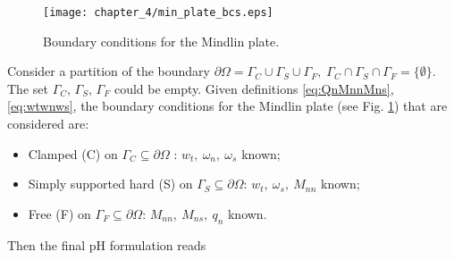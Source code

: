 \begin{figure}[tb]
	\centering
	\texttt{[image: chapter\_4/min\_plate\_bcs.eps]}
	\caption{Boundary conditions for the Mindlin plate.}
	\label{fig:bcs_min}
\end{figure}
Consider a partition of the boundary $\partial \Omega  = {\Gamma}_{C} \cup {\Gamma}_{S} \cup {\Gamma}_{F}, \; {\Gamma}_{C} \cap {\Gamma}_{S} \cap {\Gamma}_{F} = \{\emptyset\}$. The set $\Gamma_{C}, \, \Gamma_{S}, \, \Gamma_{F}$ could be empty. Given definitions \eqref{eq:QnMnnMns}, \eqref{eq:wtwnws}, the boundary conditions for the Mindlin plate \cite{duran1999approximation} (see Fig. \ref{fig:bcs_min}) that are considered are:
\begin{itemize}
\item Clamped (C) on $\Gamma_{C}\subseteq \partial \Omega$ : $w_t, \ \omega_{n}, \ \omega_{s}$ known;
\item Simply supported hard (S) on $\Gamma_{S}\subseteq \partial \Omega$: $w_t, \ \omega_{s}, \ M_{nn}$ known;
\item Free (F) on $\Gamma_{F}\subseteq \partial \Omega$: $M_{nn}, \ M_{ns}, \ q_n$ known.
\end{itemize}
Then the final pH formulation reads

